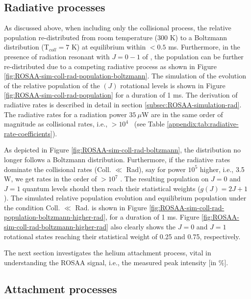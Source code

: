 \subsection{Radiative processes}
\label{subsec:CD+-kinetics-simulation-coll-rad}

As discussed above, when including only the collisional process, the relative
population re-distributed from room temperature (300 K) to a Boltzmann
distribution (T$_{coll}=7$ K) at equilibrium within $<0.5$ ms. Furthermore, in
the presence of radiation resonant with $J=0-1$ of \CD, the population can be
further re-distributed due to a competing radiative process as shown in Figure
\ref{fig:ROSAA-sim-coll-rad-population-boltzmann}. The simulation of the
evolution of the relative population of the \CD$(J)$ rotational levels is shown
in Figure \ref{fig:ROSAA-sim-coll-rad-population} for a duration of 1 ms. The
derivation of radiative rates is described in detail in section
\ref{subsec:ROSAA-simulation-rad}. The radiative rates for a radiation power $35\ \mu$W are
in the same order of magnitude as collisional rates, i.e., $>10^{4}$ \pers\
(see Table \ref{appendix:tab:radiative-rate-coefficients}).



As depicted in Figure \ref{fig:ROSAA-sim-coll-rad-boltzmann}, the distribution
no longer follows a Boltzmann distribution. Furthermore, if the radiative rates
dominate the collisional rates (Coll. $\ll$ Rad), say for power $10^{5}$
higher, i.e., 3.5 W, we get rates in the order of $>10^{7}$ \pers. The
resulting population on $J=0$ and $J=1$ quantum levels should then reach their
statistical weights ($g(J) = 2J + 1$). The simulated relative population
evolution and equilibrium population under the condition Coll. $\ll$ Rad. is
shown in Figure \ref{fig:ROSAA-sim-coll-rad-population-boltzmann-higher-rad},
for a duration of 1 ms. Figure
\ref{fig:ROSAA-sim-coll-rad-boltzmann-higher-rad} also clearly shows the $J=0$
and $J=1$ rotational states reaching their statistical weight of 0.25 and 0.75,
respectively.



The next section investigates the helium attachment process, vital in
understanding the ROSAA signal, i.e., the measured peak intensity [in $\%$].

\subsection{Attachment processes}
\label{subsec:CD+-kinetics-simulation-coll-rad-att}

